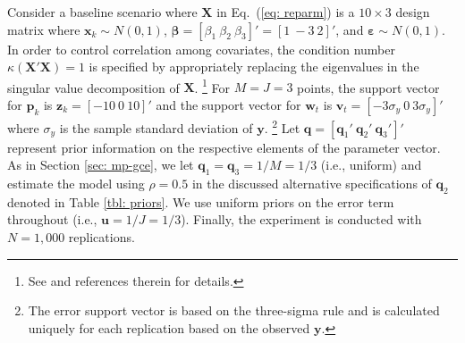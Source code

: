 \documentclass{elsarticle}
\begin{document}
Consider a baseline scenario where $\mathbf{X}$ in Eq.\ (\ref{eq: reparm})
is a $10 \times 3$ design matrix where $\mathbf{x}_k \sim 
N(0,1)$, $\mathbf{\beta}= [\beta_1 ~ \beta_2 ~ \beta_3]'=[1 ~ -3 ~ 2]'$, 
and $\mathbf{\varepsilon} \sim N(0,1)$.
In order to control correlation among covariates, the condition
number $\kappa(\mathbf{X}'\mathbf{X})=1$ is specified by appropriately replacing the 
eigenvalues in the singular value decomposition of $\mathbf{X}$.%
\footnote{See \citet[pg.\ 133]{golan1996} and references therein for 
details.}
For $M=J=3$ points, the support vector for $\mathbf{p}_k$ is 
$\mathbf{z}_k = [- 10 ~ 0 ~ 10]'$ and the support vector for $\mathbf{w}_t$ 
is $\mathbf{v}_t = [- 3\sigma_y ~ 0 ~ 3\sigma_y]'$ where $\sigma_y$ is the sample
standard deviation of $\mathbf{y}$.%
\footnote{The error support vector is based on the three-sigma
rule \citep{pukelsheim1994} and is calculated 
uniquely for each replication based on the observed $\mathbf{y}$.}
Let $\mathbf{q} = [\mathbf{q}_1' ~ 
\mathbf{q}_2' ~ \mathbf{q}_3']'$ represent prior information on the 
respective elements of the parameter vector.
As in Section \ref{sec: mp-gce}, we let $\mathbf{q}_1 = \mathbf{q}_3 = 1/M 
= 1/3$ (i.e., uniform) and estimate the model using $\rho=0.5$  in the 
discussed alternative specifications of $\mathbf{q}_2$ denoted in Table \ref{tbl: priors}.
We use uniform priors on the error term throughout (i.e., $\mathbf{u} = 1/J = 1/3$).
Finally, the experiment is conducted with $N=1,000$ replications.

\footnotesize
{}
\normalsize
\end{document}
